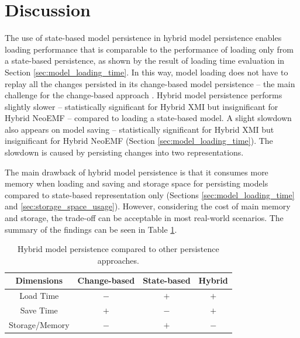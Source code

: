 \section{Discussion}
\label{sec:discussion_5}
The use of state-based model persistence in hybrid model persistence enables
loading performance that is comparable to the performance of loading only from a state-based persistence, as shown by the result of loading time evaluation in Section \ref{sec:model_loading_time}. In this way, model loading does not have to replay all the changes persisted in its change-based model persistence -- the main challenge for the change-based approach \cite{yohannis2018towards,mens2002state}. Hybrid model persistence performs slightly slower -- statistically significant for Hybrid XMI but insignificant for Hybrid NeoEMF -- compared to loading a state-based model. A slight slowdown also appears on model saving -- statistically significant for Hybrid XMI but insignificant for Hybrid NeoEMF (Section \ref{sec:model_loading_time}). The slowdown is caused by persisting changes into two representations. 

The main drawback of hybrid model persistence is that it consumes more memory when loading and saving and storage space for persisting models compared to state-based representation only (Sections \ref{sec:model_loading_time} and \ref{sec:storage_space_usage}). However, considering the cost of main memory and storage, the trade-off can be acceptable in most real-world scenarios. The summary of the findings can be seen in Table \ref{table:persistence_comparison_conclusion}.

\begin{table}[ht]
  \caption{Hybrid model persistence compared to other persistence approaches.}
  \label{table:persistence_comparison_conclusion}
  \centering
  \begin{small}
    \begin{tabular}{ c c c c }
      \hline 
      \textbf{Dimensions} & \textbf{Change-based} & \textbf{State-based} & \textbf{Hybrid}  \\
      \hline 
      Load Time & $-$ & $+$ & $+$ \\
      Save Time & $+$ & $-$ & $+$ \\
      Storage/Memory & $-$ & $+$ & $-$ \\
      \hline 
    \end{tabular}
  \end{small}
\end{table}

